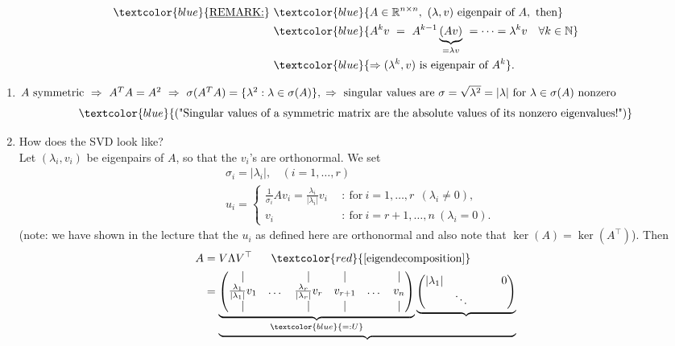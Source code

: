 {\color{solution}
\begin{align*}
\textcolor{blue}{ \text{\underline{REMARK:}}}~
&\textcolor{blue}{A\in\mathbb{R}^{n\times n},~(\lambda, v)~\text{eigenpair of}~A,~\text{then}}\\
&\textcolor{blue}{A^k v~=~A^{k-1}\underbrace{(Av)}_{=\lambda v}~=\dots=\lambda^k v~~~\forall k\in\mathbb{N}}\\
&\textcolor{blue}{\Rightarrow (\lambda^k, v)~\text{is eigenpair of}~A^k}.
\end{align*}
\begin{enumerate}
	\item 
	$A~\text{symmetric}~\Rightarrow~ A^TA=A^2~\Rightarrow~\sigma(A^TA)=\{\lambda^2:\lambda\in\sigma(A)\},\\
	\Rightarrow~\text{singular values are}~\sigma=\sqrt{\lambda^2}=|\lambda|~\text{for}~\lambda\in\sigma(A) ~\text{nonzero}$
	$$\textcolor{blue}{\text{("Singular values of a symmetric matrix are the absolute values of its nonzero eigenvalues!")}}$$
	\item 
	How does the SVD look like?\\Let $(\lambda_i, v_i)$ be eigenpairs of $A$, so that the $v_i$'s are orthonormal. We set
	\begin{align*}
	&\sigma_i=|\lambda_i|,~~~~(i=1,\dots,r)\\
	&u_i=
	\begin{cases}
	\frac{1}{\sigma_i}Av_i=\frac{\lambda_i}{|\lambda_i|}v_i~~&:~\text{for}~ i=1,\dots,r~~ (\lambda_i\neq 0),\\
	v_i	&:~\text{for}~i=r+1,\dots,n~(\lambda_i=0).  
	\end{cases}
	\end{align*}
 (note: we have shown in the lecture that the $u_i$ as defined here are orthonormal and also note that $\ker(A)=\ker(A^\top)$). Then
	\begin{align*}
	 A
	 &=V\Lambda V^\top~~~~~\textcolor{red}{\text{[eigendecomposition]}}\\
	&=\underbrace{\underbrace{\begin{pmatrix}|& &|&|& &|\\\frac{\lambda_1}{|\lambda_1|}v_1&\dots&\frac{\lambda_r}{|\lambda_r|}v_r&v_{r+1}&\dots&v_n\\|& &|&|& &|\end{pmatrix}}_{\textcolor{blue}{=:U}}
	\underbrace{
		\begin{pmatrix}
		|\lambda_1|&       &            & &0\\ 
		           &\ddots        & & & \\

\end{pmatrix}}}
\end{align*}
\end{enumerate}}
